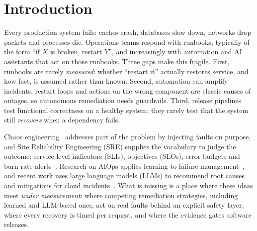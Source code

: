 \section{Introduction}
Every production system fails: caches crash, databases slow down, networks drop packets and
processes die. Operations teams respond with runbooks, typically of the form ``if $X$ is broken,
restart $Y$'', and increasingly with automation and AI assistants that act on those runbooks.
Three gaps make this fragile. First, runbooks are rarely \emph{measured}: whether ``restart it''
actually restores service, and how fast, is assumed rather than known. Second, automation can
amplify incidents: restart loops and actions on the wrong component are classic causes of
outages, so autonomous remediation needs guardrails. Third, release pipelines test functional
correctness on a healthy system; they rarely test that the system still \emph{recovers} when a
dependency fails.

Chaos engineering~\cite{basiri2016chaos,principlesofchaos} addresses part of the problem by
injecting faults on purpose, and Site Reliability Engineering (SRE) supplies the vocabulary to
judge the outcome: service level indicators (SLIs), objectives (SLOs), error budgets and burn-rate
alerts~\cite{beyer2016sre,beyer2018workbook}. Research on AIOps applies learning to failure
management~\cite{dang2019aiops,notaro2021survey}, and recent work uses large language models
(LLMs) to recommend root causes and mitigations for cloud
incidents~\cite{ahmed2023recommending,chen2024rcacopilot,roy2024agents}. What is missing is a
place where these ideas meet \emph{under measurement}: where competing remediation strategies,
including learned and LLM-based ones, act on real faults behind an explicit safety layer, where
every recovery is timed per request, and where the evidence gates software releases.

